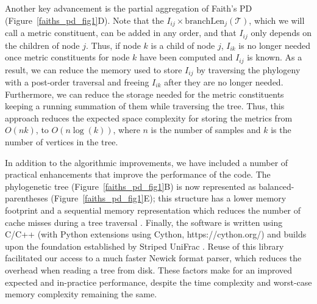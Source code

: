 Another key advancement is the partial aggregation of Faith's PD (Figure~\ref{faiths_pd_fig1}D). Note that the $I_{ij} \times \text{branchLen}_j(\mathcal{T})$, which we will call a metric constituent, can be added in any order, and that $I_{ij}$ only depends on the children of node $j$. Thus, if node $k$ is a child of node $j$, $I_{ik}$ is no longer needed once metric constituents for node $k$ have been computed and $I_{ij}$ is known. As a result, we can reduce the memory used to store $I_{ij}$ by traversing the phylogeny with a post-order traversal and freeing $I_{ik}$ after they are no longer needed. Furthermore, we can reduce the storage needed for the metric constituents keeping a running summation of them while traversing the tree. Thus, this approach reduces the expected space complexity for storing the metrics from $O(n k)$, to $O(n \log(k))$, where $n$ is the number of samples and $k$ is the number of vertices in the tree.

In addition to the algorithmic improvements, we have included a number of practical enhancements that improve the performance of the code. The phylogenetic tree (Figure~\ref{faiths_pd_fig1}B) is now represented as balanced-parentheses (Figure~\ref{faiths_pd_fig1}E); this structure has a lower memory footprint and a sequential memory representation which reduces the number of cache misses during a tree traversal \cite{Cordova2016-vf}. Finally, the software is written using C/C++ (with Python extensions using Cython, https://cython.org/) and builds upon the foundation established by Striped UniFrac \cite{McDonald2018-qq}. Reuse of this library facilitated our access to a much faster Newick format parser, which reduces the overhead when reading a tree from disk. These factors make for an improved expected and in-practice performance, despite the time complexity and worst-case memory complexity remaining the same.

